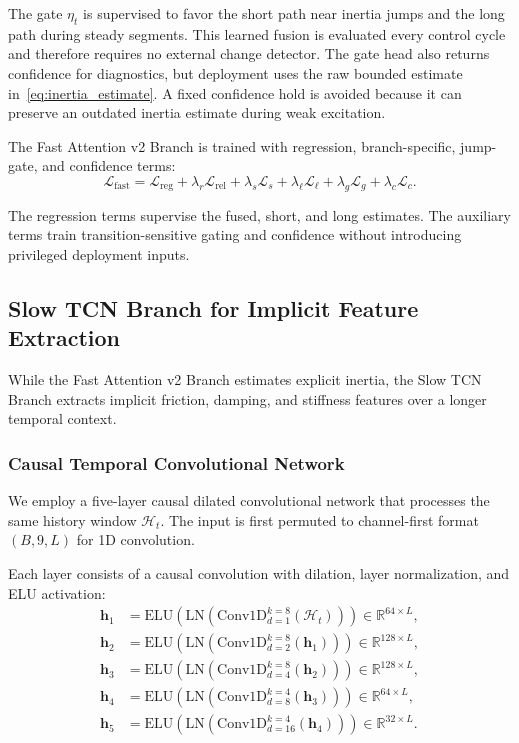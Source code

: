 \documentclass[letterpaper,journal]{IEEEtran}
\begin{document}
The gate $\eta_t$ is supervised to favor the short path near inertia jumps and the long path during steady segments. This learned fusion is evaluated every control cycle and therefore requires no external change detector. The gate head also returns confidence for diagnostics, but deployment uses the raw bounded estimate in~\eqref{eq:inertia_estimate}. A fixed confidence hold is avoided because it can preserve an outdated inertia estimate during weak excitation.

The Fast Attention v2 Branch is trained with regression, branch-specific, jump-gate, and confidence terms:
\begin{equation}
\mathcal{L}_{\text{fast}}=\mathcal{L}_{\text{reg}}+\lambda_r\mathcal{L}_{\text{rel}}+\lambda_s\mathcal{L}_s+\lambda_{\ell}\mathcal{L}_{\ell}+\lambda_g\mathcal{L}_g+\lambda_c\mathcal{L}_c.
\label{eq:fast_loss}
\end{equation}

\noindent The regression terms supervise the fused, short, and long estimates. The auxiliary terms train transition-sensitive gating and confidence without introducing privileged deployment inputs.

\subsection{Slow TCN Branch for Implicit Feature Extraction}

While the Fast Attention v2 Branch estimates explicit inertia, the Slow TCN Branch extracts implicit friction, damping, and stiffness features over a longer temporal context.

\subsubsection{Causal Temporal Convolutional Network}

We employ a five-layer causal dilated convolutional network that processes the same history window $\mathcal{H}_t$. The input is first permuted to channel-first format $(B, 9, L)$ for 1D convolution.

Each layer consists of a causal convolution with dilation, layer normalization, and ELU activation:
\begin{equation}
\begin{aligned}
\bm{h}_1 &= \text{ELU}(\text{LN}(\text{Conv1D}_{d=1}^{k=8}(\mathcal{H}_t))) \in \mathbb{R}^{64 \times L}, \\
\bm{h}_2 &= \text{ELU}(\text{LN}(\text{Conv1D}_{d=2}^{k=8}(\bm{h}_1))) \in \mathbb{R}^{128 \times L}, \\
\bm{h}_3 &= \text{ELU}(\text{LN}(\text{Conv1D}_{d=4}^{k=8}(\bm{h}_2))) \in \mathbb{R}^{128 \times L}, \\
\bm{h}_4 &= \text{ELU}(\text{LN}(\text{Conv1D}_{d=8}^{k=4}(\bm{h}_3))) \in \mathbb{R}^{64 \times L}, \\
\bm{h}_5 &= \text{ELU}(\text{LN}(\text{Conv1D}_{d=16}^{k=4}(\bm{h}_4))) \in \mathbb{R}^{32 \times L}.
\end{aligned}
\label{eq:tcn_stack}
\end{equation}
\end{document}
